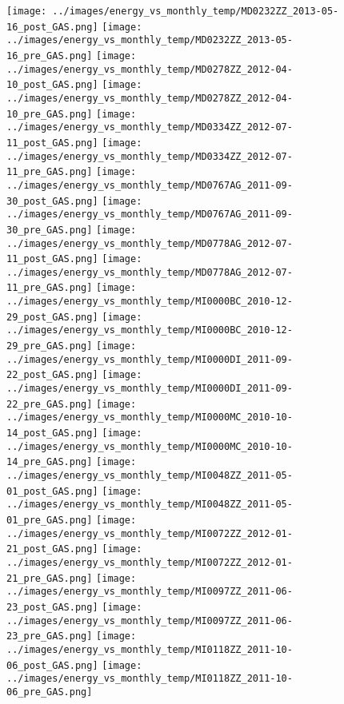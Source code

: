 \clearpage
\begin{figure}
\centering
\texttt{[image: ../images/energy\_vs\_monthly\_temp/MD0232ZZ\_2013-05-16\_post\_GAS.png]}
\texttt{[image: ../images/energy\_vs\_monthly\_temp/MD0232ZZ\_2013-05-16\_pre\_GAS.png]}
\texttt{[image: ../images/energy\_vs\_monthly\_temp/MD0278ZZ\_2012-04-10\_post\_GAS.png]}
\texttt{[image: ../images/energy\_vs\_monthly\_temp/MD0278ZZ\_2012-04-10\_pre\_GAS.png]}
\texttt{[image: ../images/energy\_vs\_monthly\_temp/MD0334ZZ\_2012-07-11\_post\_GAS.png]}
\texttt{[image: ../images/energy\_vs\_monthly\_temp/MD0334ZZ\_2012-07-11\_pre\_GAS.png]}
\texttt{[image: ../images/energy\_vs\_monthly\_temp/MD0767AG\_2011-09-30\_post\_GAS.png]}
\texttt{[image: ../images/energy\_vs\_monthly\_temp/MD0767AG\_2011-09-30\_pre\_GAS.png]}
\texttt{[image: ../images/energy\_vs\_monthly\_temp/MD0778AG\_2012-07-11\_post\_GAS.png]}
\texttt{[image: ../images/energy\_vs\_monthly\_temp/MD0778AG\_2012-07-11\_pre\_GAS.png]}
\texttt{[image: ../images/energy\_vs\_monthly\_temp/MI0000BC\_2010-12-29\_post\_GAS.png]}
\texttt{[image: ../images/energy\_vs\_monthly\_temp/MI0000BC\_2010-12-29\_pre\_GAS.png]}
\texttt{[image: ../images/energy\_vs\_monthly\_temp/MI0000DI\_2011-09-22\_post\_GAS.png]}
\texttt{[image: ../images/energy\_vs\_monthly\_temp/MI0000DI\_2011-09-22\_pre\_GAS.png]}
\texttt{[image: ../images/energy\_vs\_monthly\_temp/MI0000MC\_2010-10-14\_post\_GAS.png]}
\texttt{[image: ../images/energy\_vs\_monthly\_temp/MI0000MC\_2010-10-14\_pre\_GAS.png]}
\texttt{[image: ../images/energy\_vs\_monthly\_temp/MI0048ZZ\_2011-05-01\_post\_GAS.png]}
\texttt{[image: ../images/energy\_vs\_monthly\_temp/MI0048ZZ\_2011-05-01\_pre\_GAS.png]}
\texttt{[image: ../images/energy\_vs\_monthly\_temp/MI0072ZZ\_2012-01-21\_post\_GAS.png]}
\texttt{[image: ../images/energy\_vs\_monthly\_temp/MI0072ZZ\_2012-01-21\_pre\_GAS.png]}
\texttt{[image: ../images/energy\_vs\_monthly\_temp/MI0097ZZ\_2011-06-23\_post\_GAS.png]}
\texttt{[image: ../images/energy\_vs\_monthly\_temp/MI0097ZZ\_2011-06-23\_pre\_GAS.png]}
\texttt{[image: ../images/energy\_vs\_monthly\_temp/MI0118ZZ\_2011-10-06\_post\_GAS.png]}
\texttt{[image: ../images/energy\_vs\_monthly\_temp/MI0118ZZ\_2011-10-06\_pre\_GAS.png]}
\end{figure}
